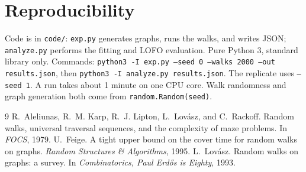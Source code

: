 \documentclass{article}
\begin{document}
\section{Reproducibility}
Code is in \texttt{code/}: \texttt{exp.py} generates graphs, runs the walks, and writes JSON; \texttt{analyze.py} performs the fitting and LOFO evaluation. Pure Python 3, standard library only. Commands: \texttt{python3 -I exp.py --seed 0 --walks 2000 --out results.json}, then \texttt{python3 -I analyze.py results.json}. The replicate uses \texttt{--seed 1}. A run takes about 1 minute on one CPU core. Walk randomness and graph generation both come from \texttt{random.Random(seed)}.

\begin{thebibliography}{9}
R.~Aleliunas, R.~M. Karp, R.~J. Lipton, L.~Lov\'asz, and C.~Rackoff.
\newblock Random walks, universal traversal sequences, and the complexity of maze problems.
\newblock In \emph{FOCS}, 1979.
U.~Feige.
\newblock A tight upper bound on the cover time for random walks on graphs.
\newblock \emph{Random Structures \& Algorithms}, 1995.
L.~Lov\'asz.
\newblock Random walks on graphs: a survey.
\newblock In \emph{Combinatorics, Paul Erd\H{o}s is Eighty}, 1993.
\end{thebibliography}
\end{document}
